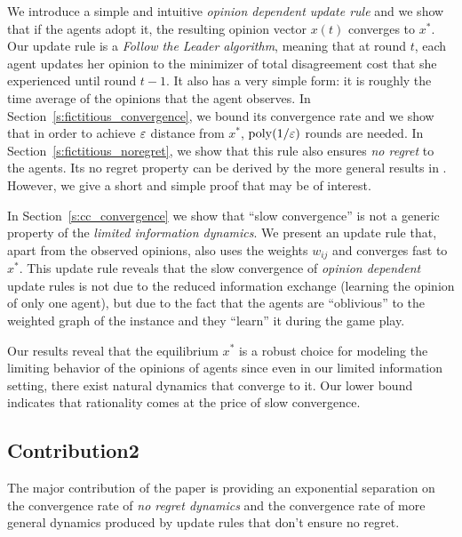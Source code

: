We introduce a simple and intuitive \emph{opinion dependent update rule} and we
show that if the agents adopt it, the resulting opinion vector $x(t)$ converges
to $x^*$.  Our update rule is a \emph{Follow the Leader algorithm}, meaning
that at round $t$, each agent updates her opinion to the minimizer of total
disagreement cost that she experienced until round $t-1$.  It also has a very
simple form: it is roughly the time average of the opinions that the agent
observes.  In Section~\ref{s:fictitious_convergence}, we bound its convergence
rate and we show that in order to achieve $\varepsilon$ distance from $x^*$,
$\mathrm{poly}(1/\varepsilon)$ rounds are needed.  In
Section~\ref{s:fictitious_noregret}, we show that this rule also ensures
\emph{no regret} to the agents.  Its no regret property can be derived by the
more general results in \cite{HAK07}.  However, we give a short and simple
proof that may be of interest.

In Section~\ref{s:cc_convergence} we show that \enquote{slow convergence} is
not a generic property of the \emph{limited information dynamics}.  We present
an update rule that, apart from the observed opinions, also uses the weights
$w_{ij}$ and converges fast to $x^*$.  This update rule reveals that the slow
convergence of \emph{opinion dependent} update rules is not due to the reduced
information exchange (learning the opinion of only one agent), but due to the
fact that the agents are \enquote{oblivious} to the weighted graph of the
instance and they \enquote{learn} it during the game play.

Our results reveal that the equilibrium $x^*$ is a robust choice for modeling
the limiting behavior of the opinions of agents since even in our limited
information setting, there exist natural dynamics that converge to it.  Our
lower bound indicates that rationality comes at the price of slow
convergence.

\subsection{Contribution2} 
The major contribution of the paper is providing 
an exponential separation on the convergence
rate of \emph{no regret dynamics} and the convergence
rate of more general dynamics produced by update rules
that don't ensure no regret.

